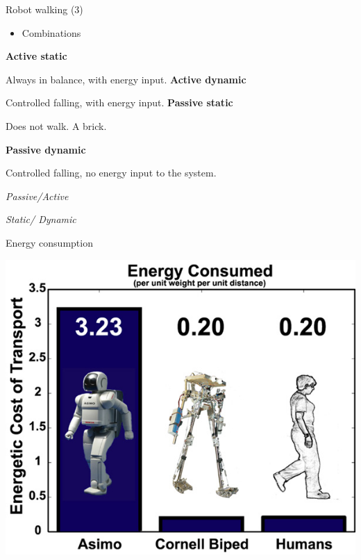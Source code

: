 \documentclass[compress]{beamer}
\begin{document}
\begin{frame}{Robot walking (3)}


    \begin{itemize}

        \item Combinations
    \end{itemize}

    \textbf{Active static}


    Always in balance, with energy input.
    \textbf{Active dynamic}

    Controlled falling, with energy input.
    \textbf{Passive static}


    Does not walk. A brick.

    \textbf{Passive dynamic}

    Controlled falling, no energy input to the system.

    \emph{Passive/Active}

    \emph{Static/ Dynamic}

\end{frame}

\begin{frame}{Energy consumption}

    \begin{center}
        \includegraphics[width=0.8\linewidth]{image14}
    \end{center}
\end{frame}
\end{document}
